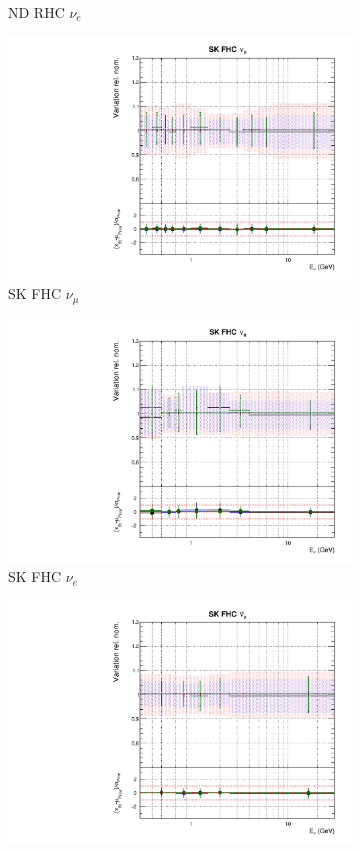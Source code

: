 \begin{figure}[t]
\begin{subfigure}{0.24\textwidth}
  \caption{ND RHC $\nu_e$}
\end{subfigure}
\begin{subfigure}{0.24\textwidth}
  \centering
  \includegraphics[width=0.95\linewidth]{figs/hptpcfitsflux_8}
  \caption{SK FHC $\nu_{\mu}$}
\end{subfigure}
\begin{subfigure}{0.24\textwidth}
  \centering
  \includegraphics[width=0.95\linewidth]{figs/hptpcfitsflux_9}
  \caption{SK FHC $\nu_e$}
\end{subfigure}
\begin{subfigure}{0.24\textwidth}
  \centering
  \includegraphics[width=0.95\linewidth]{figs/hptpcfitsflux_10}

\end{subfigure}
\end{figure}

